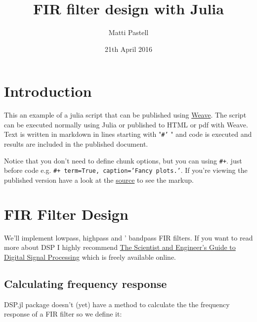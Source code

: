 \documentclass[12pt,a4paper]{article}
\title{ FIR filter design with Julia }
\author{ Matti Pastell }
\date{ 21th April 2016 }
\begin{document}
\maketitle


\section{Introduction}

This an example of a julia script that can be published using \href{http://mpastell.github.io/Weave.jl/latest/usage/}{Weave}. The script can be executed normally using Julia or published to HTML or pdf with Weave. Text is written in markdown in lines starting with "\texttt{\#'} " and code is executed and results are included in the published document.


Notice that you don't need to define chunk options, but you can using \texttt{\#+}. just before code e.g. \texttt{\#+ term=True, caption='Fancy plots.'}. If you're viewing the published version have a look at the \href{FIR_design_plots.jl}{source} to see the markup.


\section{FIR Filter Design}

We'll implement lowpass, highpass and ' bandpass FIR filters. If you want to read more about DSP I highly recommend \href{http://www.dspguide.com/}{The Scientist and Engineer's Guide to Digital Signal Processing} which is freely available online.


\subsection{Calculating frequency response}

DSP.jl package doesn't (yet) have a method to calculate the the frequency response of a FIR filter so we define it:
\end{document}

